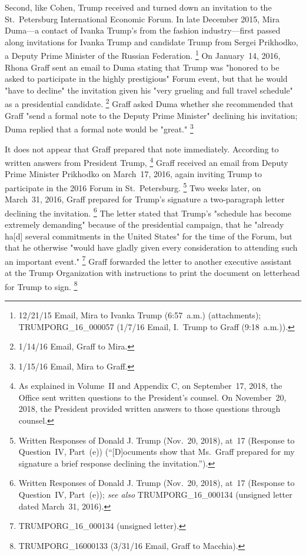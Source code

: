 Second, like Cohen, Trump received and turned down an invitation to the St.~Petersburg International Economic Forum.
In late December 2015, Mira Duma---a contact of Ivanka Trump's from the fashion industry---first passed along invitations for Ivanka Trump and candidate Trump from Sergei Prikhodko, a Deputy Prime Minister of the Russian Federation.%
\footnote{12/21/15 Email, Mira to Ivanka Trump (6:57~a.m.) (attachments);
TRUMPORG\_16\_000057 (1/7/16 Email, I.~Trump to Graff (9:18~a.m.)).}
On January~14, 2016, Rhona Graff sent an email to Duma stating that Trump was "honored to be asked to participate in the highly prestigious" Forum event, but that he would "have to decline" the invitation given his "very grueling and full travel schedule" as a presidential candidate.%
\footnote{1/14/16 Email, Graff to Mira.}
Graff asked Duma whether she recommended that Graff "send a formal note to the Deputy Prime Minister" declining his invitation; Duma replied that a formal note would be "great."%
\footnote{1/15/16 Email, Mira to Graff.}

It does not appear that Graff prepared that note immediately.
According to written answers from President Trump,%
\footnote{As explained in Volume~II and Appendix C, on September~17, 2018, the Office sent written questions to the President's counsel.
On November~20, 2018, the President provided written answers to those questions through counsel.}
Graff received an email from Deputy Prime Minister Prikhodko on March~17, 2016, again inviting Trump to participate in the 2016 Forum in St.~Petersburg.%
\footnote{Written Responses of Donald J. Trump (Nov.~20, 2018), at~17 (Response to Question~IV, Part~(e)) (``[D]ocuments show that Ms.~Graff prepared for my signature a brief response declining the invitation.'').}
Two weeks later, on March~31, 2016, Graff prepared for Trump's signature a two-paragraph letter declining the invitation.%
\footnote{Written Responses of Donald J. Trump (Nov.~20, 2018), at~17 (Response to Question~IV, Part~(e));
\textit{see also} TRUMPORG\_16\_000134 (unsigned letter dated March~31, 2016).}
The letter stated that Trump's "schedule has become extremely demanding" because of the presidential campaign, that he "already ha[d] several commitments in the United States" for the time of the Forum, but that he otherwise "would have gladly given every consideration to attending such an important event."%
\footnote{TRUMPORG\_16\_000134 (unsigned letter).}
Graff forwarded the letter to another executive assistant at the Trump Organization with instructions to print the document on letterhead for Trump to sign.%
\footnote{TRUMPORG\_16000133 (3/31/16 Email, Graff to Macchia).}

